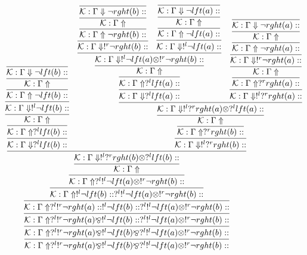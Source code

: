 \documentclass[a4paper, 11pt]{article}
\begin{document}
{\tiny
$$
\infer{\mathcal{K} : \Gamma \Uparrow  ?^{l}  !^{r} \neg rght (a)  \bindnasrepma  !^{l} \neg lft (b)  \bindnasrepma  ?^{l}  !^{l} \neg lft (a)  \otimes  !^{r} \neg rght (b)  :: }
{\infer{\mathcal{K} : \Gamma \Uparrow  ?^{l}  !^{r} \neg rght (a)  \bindnasrepma  !^{l} \neg lft (b)  \bindnasrepma  ?^{l}  !^{l} \neg lft (a)  \otimes  !^{r} \neg rght (b)  :: }
{\infer{\mathcal{K} : \Gamma \Uparrow  ?^{l}  !^{r} \neg rght (a)  \bindnasrepma  !^{l} \neg lft (b)  ::  ?^{l}  !^{l} \neg lft (a)  \otimes  !^{r} \neg rght (b)  :: }
{\infer{\mathcal{K} : \Gamma \Uparrow  ?^{l}  !^{r} \neg rght (a)  ::  !^{l} \neg lft (b)  ::  ?^{l}  !^{l} \neg lft (a)  \otimes  !^{r} \neg rght (b)  :: }
{\infer{\mathcal{K} : \Gamma \Uparrow  !^{l} \neg lft (b)  ::  ?^{l}  !^{l} \neg lft (a)  \otimes  !^{r} \neg rght (b)  :: }
{\infer{\mathcal{K} : \Gamma \Uparrow  ?^{l}  !^{l} \neg lft (a)  \otimes  !^{r} \neg rght (b)  :: }
{\infer{\mathcal{K} : \Gamma \Uparrow }
{\infer{\mathcal{K} : \Gamma \Downarrow  !^{l}  ?^{r} rght (b)  \otimes  ?^{l} lft (b)  :: }
{\infer{\mathcal{K} : \Gamma \Downarrow  ?^{l} lft (b)  :: }
{\infer{\mathcal{K} : \Gamma \Uparrow  ?^{l} lft (b)  :: }
{\infer{\mathcal{K} : \Gamma \Uparrow }
{\infer{\mathcal{K} : \Gamma \Downarrow  !^{l} \neg lft (b)  :: }
{\infer{\mathcal{K} : \Gamma \Uparrow \neg lft (b)  :: }
{\infer{\mathcal{K} : \Gamma \Uparrow }
{\infer{\mathcal{K} : \Gamma \Downarrow \neg lft (b)  :: }
{}}}}}}} & \infer{\mathcal{K} : \Gamma \Downarrow  !^{l}  ?^{r} rght (b)  :: }
{\infer{\mathcal{K} : \Gamma \Uparrow  ?^{r} rght (b)  :: }
{\infer{\mathcal{K} : \Gamma \Uparrow }
{\infer{\mathcal{K} : \Gamma \Downarrow  !^{l}  ?^{r} rght (a)  \otimes  ?^{l} lft (a)  :: }
{\infer{\mathcal{K} : \Gamma \Downarrow  ?^{l} lft (a)  :: }
{\infer{\mathcal{K} : \Gamma \Uparrow  ?^{l} lft (a)  :: }
{\infer{\mathcal{K} : \Gamma \Uparrow }
{\infer{\mathcal{K} : \Gamma \Downarrow  !^{l} \neg lft (a)  \otimes  !^{r} \neg rght (b)  :: }
{\infer{\mathcal{K} : \Gamma \Downarrow  !^{r} \neg rght (b)  :: }
{\infer{\mathcal{K} : \Gamma \Uparrow \neg rght (b)  :: }
{\infer{\mathcal{K} : \Gamma \Uparrow }
{\infer{\mathcal{K} : \Gamma \Downarrow \neg rght (b)  :: }
{}}}} & \infer{\mathcal{K} : \Gamma \Downarrow  !^{l} \neg lft (a)  :: }
{\infer{\mathcal{K} : \Gamma \Uparrow \neg lft (a)  :: }
{\infer{\mathcal{K} : \Gamma \Uparrow }
{\infer{\mathcal{K} : \Gamma \Downarrow \neg lft (a)  :: }
{}}}}}}}} & \infer{\mathcal{K} : \Gamma \Downarrow  !^{l}  ?^{r} rght (a)  :: }
{\infer{\mathcal{K} : \Gamma \Uparrow  ?^{r} rght (a)  :: }
{\infer{\mathcal{K} : \Gamma \Uparrow }
{\infer{\mathcal{K} : \Gamma \Downarrow  !^{r} \neg rght (a)  :: }
{\infer{\mathcal{K} : \Gamma \Uparrow \neg rght (a)  :: }
{\infer{\mathcal{K} : \Gamma \Uparrow }
{\infer{\mathcal{K} : \Gamma \Downarrow \neg rght (a)  :: }
{}}}}}}}}}}}}}}}}}}}$$
}
\end{document}
